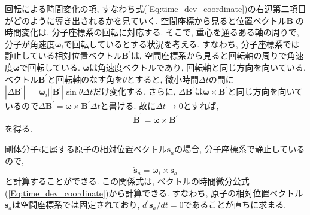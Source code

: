 回転による時間変化の項, すなわち式(\ref{Eq:time_dev_coordinate})の右辺第二項目がどのように導き出されるかを見ていく.
空間座標から見ると位置ベクトル$\bm{B}^{\prime}$の時間変化は, 分子座標系の回転に対応する. 
そこで, 重心を通るある軸の周りで, 分子が角速度$\bm{\omega}_{i}$で回転しているとする状況を考える.
すなわち, 分子座標系では静止している相対位置ベクトル$\bm{B}^{\prime}$は, 空間座標系から見ると回転軸の周りで角速度$\bm{\omega}$で回転している.
$\bm{\omega}$は角速度ベクトルであり, 回転軸と同じ方向を向いている.
ベクトル$\bm{B}^{\prime}$と回転軸のなす角を$\theta$とすると, 微小時間$\Delta t$の間に$|\Delta \bm{B}^{\prime}| =|\bm{\omega}_{i}| |\bm{B}^{\prime}| \sin \theta \Delta t$だけ変化する. さらに, $\Delta \bm{B}^{\prime}$は$\bm{\omega} \times \bm{B}^{\prime}$と同じ方向を向いているので$\Delta \bm{B}^{\prime} = \bm{\omega} \times \bm{B}^{\prime} \Delta t$と書ける. 故に$\Delta t \to 0$とすれば,
\begin{equation}
  \dot{\bm{B}}^{\prime}
  =
  \bm{\omega} \times \bm{B}^{\prime}
\end{equation}
を得る.

剛体分子$i$に属する原子の相対位置ベクトル$\bm{s}_{a}$の場合, 分子座標系で静止しているので,
\begin{equation}
  \dot{\bm{s}}_{a}
  =
  \bm{\omega}_{i} \times \bm{s}_{a}
  \label{Eq:dots_omega_x_s}
\end{equation}
と計算することができる.
この関係式は, ベクトルの時間微分公式(\ref{Eq:time_dev_coordinate})から計算できる.
すなわち, 原子の相対位置ベクトル$\bm{s}_{a}$は空間座標系では固定されており, $d^{\prime}\bm{s}_{a}/dt = 0$であることが直ちに求まる.


